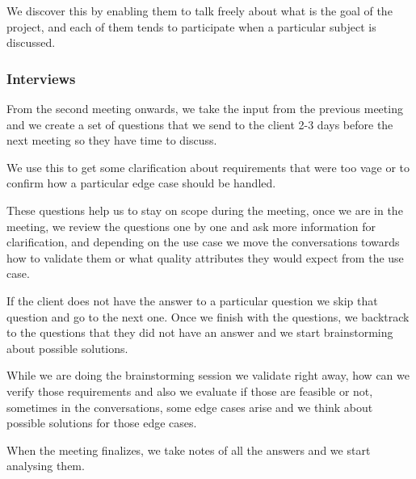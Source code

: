 \noindent We discover this by enabling them to talk freely about what is the 
goal of the project, and each of them tends to participate when a particular 
subject is discussed. \newline

\pagebreak
\subsubsection{Interviews}
From the second meeting onwards, we take the input from the previous meeting 
and we create a set of questions that we send to the client 2-3 days before 
the next meeting so they have time to discuss. \newline

\noindent We use this to get some clarification about requirements that were 
too vage or to confirm how a particular edge case should be handled. \newline

\noindent These questions help us to stay on scope during the meeting, once we 
are in the meeting, we review the questions one by one and ask more 
information for clarification, and depending on the use case we move the 
conversations towards how to validate them or what quality 
attributes they would expect from the use case. \newline

\noindent If the client does not have the answer to a particular question we 
skip that question and go to the next one. Once we finish with the questions, 
we backtrack to the questions that they did not have an answer and we start 
brainstorming about possible solutions.  \newline

\noindent While we are doing the brainstorming session we validate right 
away, how can we verify those requirements and also we evaluate if those are 
feasible or not, sometimes in the conversations, some edge cases arise and we 
think about possible solutions for those edge cases. \newline

\noindent When the meeting finalizes, we take notes of all the answers and we 
start analysing them.